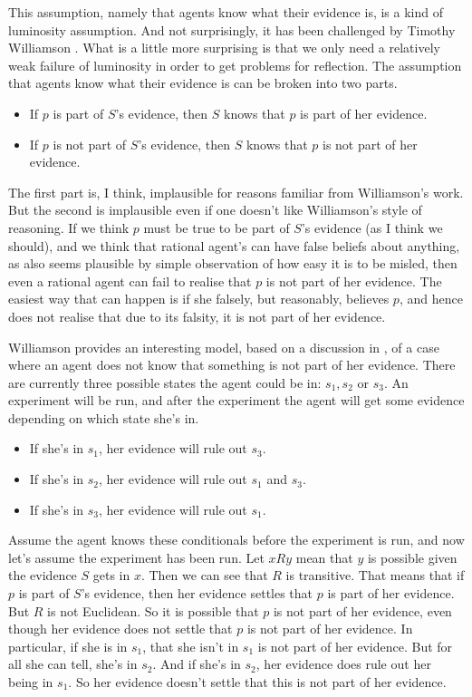This assumption, namely that agents know what their evidence is, is a kind of luminosity assumption. And not surprisingly, it has been challenged by Timothy Williamson \cite[230-3]{Williamson2000-WILKAI}. What is a little more surprising is that we only need a relatively weak failure of luminosity in order to get problems for reflection. The assumption that agents know what their evidence is can be broken into two parts.

\begin{itemize}
\item If \(p\) is part of \(S\)'s evidence, then \(S\) knows that \(p\) is part of her evidence.
\item If \(p\) is not part of \(S\)'s evidence, then \(S\) knows that \(p\) is not part of her evidence.
\end{itemize}

\noindent The first part is, I think, implausible for reasons familiar from Williamson's work. But the second is implausible even if one doesn't like Williamson's style of reasoning. If we think \(p\) must be true to be part of \(S\)'s evidence (as I think we should), and we think that rational agent's can have false beliefs about anything, as also seems plausible by simple observation of how easy it is to be misled, then even a rational agent can fail to realise that \(p\) is not part of her evidence. The easiest way that can happen is if she falsely, but reasonably, believes \(p\), and hence does not realise that due to its falsity, it is not part of her evidence.

Williamson provides an interesting model, based on a discussion in \citet{Shin1989}, of a case where an agent does not know that something is not part of her evidence. There are currently three possible states the agent could be in: \(s_1, s_2\) or \(s_3\). An experiment will be run, and after the experiment the agent will get some evidence depending on which state she's in. 

\begin{itemize}
\item If she's in \(s_1\), her evidence will rule out \(s_3\).
\item If she's in \(s_2\), her evidence will rule out \(s_1\) and \(s_3\).
\item If she's in \(s_3\), her evidence will rule out \(s_1\).
\end{itemize}

\noindent Assume the agent knows these conditionals before the experiment is run, and now let's assume the experiment has been run. Let \(xRy\) mean that \(y\) is possible given the evidence \(S\) gets in \(x\). Then we can see that \(R\) is transitive. That means that if \(p\) is part of \(S\)'s evidence, then her evidence settles that \(p\) is part of her evidence. But \(R\) is not Euclidean. So it is possible that \(p\) is not part of her evidence, even though her evidence does not settle that \(p\) is not part of her evidence. In particular, if she is in \(s_1\), that she isn't in \(s_1\) is not part of her evidence. But for all she can tell, she's in \(s_2\). And if she's in \(s_2\), her evidence does rule out her being in \(s_1\). So her evidence doesn't settle that this is not part of her evidence.

